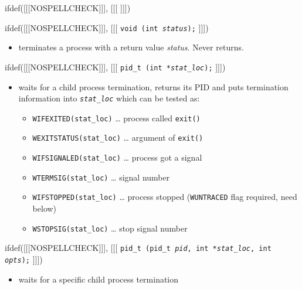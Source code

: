 
ifdef([[[NOSPELLCHECK]]], [[[
]]])

\begin{slide}
\setlength{\baselineskip}{0.6\baselineskip}
ifdef([[[NOSPELLCHECK]]], [[[
\texttt{void (int \emph{status});}
]]])
\begin{itemize}
\item terminates a process with a return value \emph{status}.  Never returns.
\end{itemize}
ifdef([[[NOSPELLCHECK]]], [[[
\texttt{pid\_t (int *\emph{stat\_loc});}
]]])
\begin{itemize}
\item waits for a child process termination, returns its PID and puts
termination information into \emph{\texttt{stat\_loc}} which can be tested as:
    \begin{itemize}
    \item \texttt{WIFEXITED(stat\_loc)} \dots{} process called
    \texttt{exit()}
    \item \texttt{WEXITSTATUS(stat\_loc)} \dots{} argument of
    \texttt{exit()}
    \item \texttt{WIFSIGNALED(stat\_loc)} \dots{} process got a signal
    \item \texttt{WTERMSIG(stat\_loc)} \dots{} signal number
    \item \texttt{WIFSTOPPED(stat\_loc)} \dots{} process stopped
    (\texttt{WUNTRACED} flag required, need  below)
    \item \texttt{WSTOPSIG(stat\_loc)} \dots{} stop signal number
    \end{itemize}
\end{itemize}
ifdef([[[NOSPELLCHECK]]], [[[
\texttt{pid\_t (pid\_t \emph{pid}, int *\emph{stat\_loc},
int \emph{opts});}
]]])
\begin{itemize}
\item waits for a specific child process termination
\end{itemize}
\end{slide}

